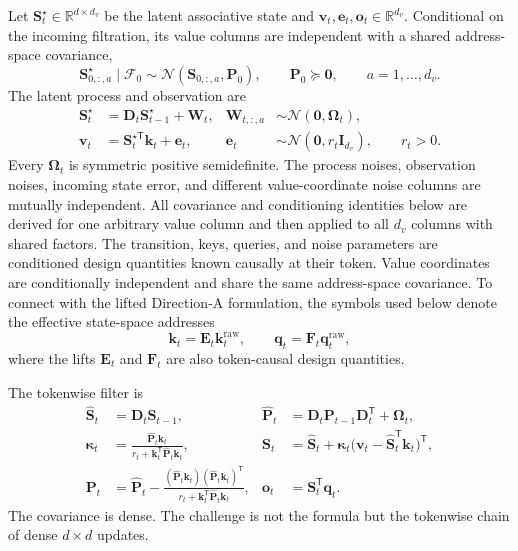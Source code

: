 \documentclass[11pt]{article}
\newcommand{\ve}[1]{\boldsymbol{#1}}
\newcommand{\tr}{\mathsf{T}}
\newcommand{\R}{\mathbb{R}}
\begin{document}
Let $\ve{S}_t^\star\in\R^{d\times d_v}$ be the latent associative state and
$\ve{v}_t,\ve{e}_t,\ve{o}_t\in\R^{d_v}$.  Conditional on the incoming filtration, its value
columns are independent with a shared address-space covariance,
\begin{equation}
  \ve{S}_{0,:,a}^\star\mid\mathcal F_0
  \sim\mathcal N(\ve{S}_{0,:,a},\ve{P}_0),
  \qquad \ve{P}_0\succeq\ve{0},
  \qquad a=1,\ldots,d_v.
\end{equation}
The latent process and observation are
\begin{align}
  \ve{S}_t^\star
    &=\ve{D}_t\ve{S}_{t-1}^\star+\ve{W}_t,
  &
  \ve{W}_{t,:,a}&\sim\mathcal N(\ve{0},\ve{\Omega}_t),
  \label{eq:process}\\
  \ve{v}_t
    &=\ve{S}_t^{\star\tr}\ve{k}_t+\ve{e}_t,
  &
  \ve{e}_t&\sim\mathcal N(\ve{0},r_t\ve{I}_{d_v}),
  \qquad r_t>0 .
  \label{eq:observation}
\end{align}
Every $\ve{\Omega}_t$ is symmetric positive semidefinite.  The process noises, observation
noises, incoming state error, and different value-coordinate noise columns are mutually
independent.  All covariance and conditioning identities below are derived for one arbitrary value
column and then applied to all $d_v$ columns with shared factors.
The transition, keys, queries, and noise parameters are conditioned design quantities known
causally at their token.  Value coordinates are conditionally independent and share the same
address-space covariance.  To connect with the lifted Direction-A formulation, the symbols used
below denote the effective state-space addresses
\begin{equation}
  \ve{k}_t=\ve{E}_t\ve{k}_t^{\mathrm{raw}},
  \qquad
  \ve{q}_t=\ve{F}_t\ve{q}_t^{\mathrm{raw}},
\end{equation}
where the lifts $\ve{E}_t$ and $\ve{F}_t$ are also token-causal design quantities.

The tokenwise filter is
\begin{align}
  \widehat{\ve{S}}_t
    &=\ve{D}_t\ve{S}_{t-1},
  &
  \widehat{\ve{P}}_t
    &=\ve{D}_t\ve{P}_{t-1}\ve{D}_t^{\tr}+\ve{\Omega}_t,
  \label{eq:token-predict}\\
  \ve{\kappa}_t
    &=\frac{\widehat{\ve{P}}_t\ve{k}_t}
      {r_t+\ve{k}_t^{\tr}\widehat{\ve{P}}_t\ve{k}_t},
  &
  \ve{S}_t
    &=\widehat{\ve{S}}_t+
      \ve{\kappa}_t
      \bigl(\ve{v}_t-\widehat{\ve{S}}_t^{\tr}\ve{k}_t\bigr)^{\tr},
  \label{eq:token-correct}\\
  \ve{P}_t
    &=\widehat{\ve{P}}_t-
      \frac{(\widehat{\ve{P}}_t\ve{k}_t)
      (\widehat{\ve{P}}_t\ve{k}_t)^{\tr}}
      {r_t+\ve{k}_t^{\tr}\widehat{\ve{P}}_t\ve{k}_t},
  &
  \ve{o}_t&=\ve{S}_t^{\tr}\ve{q}_t .
  \label{eq:token-read}
\end{align}
The covariance is dense.  The challenge is not the formula but the tokenwise chain of dense
$d\times d$ updates.
\end{document}
